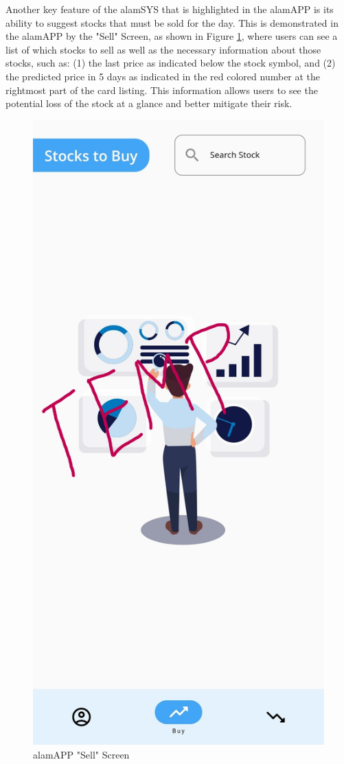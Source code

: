 \FloatBarrier


Another key feature of the alamSYS that is highlighted in the alamAPP is its ability to suggest 
stocks that must be sold for the day. This is demonstrated in the alamAPP by the "Sell" Screen, 
as shown in Figure \ref{fig:alamAPP_sell}, 
where users can see a list of which stocks to sell as well as the 
necessary information about those stocks, such as: (1) the last price as indicated below 
the stock symbol, and (2) the predicted price in 5 days as indicated in the red colored 
number at the rightmost part of the card listing. This information allows users to see the 
potential loss of the stock at a glance and better mitigate their risk.
\begin{figure}[ht]
  \centering
  \includegraphics[height=0.40\textheight]{./assets/Chapter_4/mobile_ui/temp.jpg}
  \caption{alamAPP "Sell" Screen}
  \label{fig:alamAPP_sell}
\end{figure}
